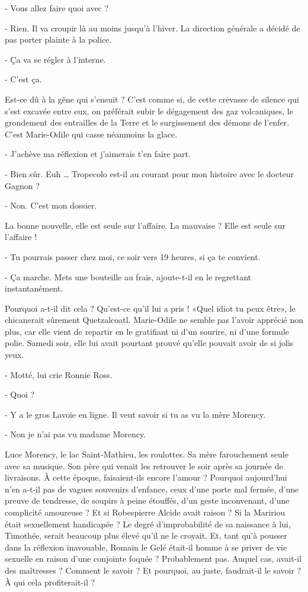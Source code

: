 - Vous allez faire quoi avec ?

- Rien. Il va croupir là au moins jusqu’à l’hiver. La direction générale a décidé de pas porter plainte à la police.

- Ça va se régler à l’interne.

- C’est ça.

Est-ce dû à la gêne qui s’ensuit ? C’est comme si, de cette crevasse de silence qui s’est excavée entre eux, on préférait subir le dégagement des gaz volcaniques, le grondement des entrailles de la Terre et le surgissement des démons de l’enfer. C’est Marie-Odile qui casse néanmoins la glace.

- J’achève ma réflexion et j’aimerais t’en faire part.

- Bien sûr. Euh … Tropecolo est-il au courant pour mon histoire avec le docteur Gagnon ?

- Non. C’est mon dossier.

La bonne nouvelle, elle est seule sur l’affaire. La mauvaise ? Elle est seule sur l’affaire !

- Tu pourrais passer chez moi, ce soir vers 19 heures, si ça te convient.

- Ça marche. Mets une bouteille au frais, ajoute-t-il en le regrettant instantanément.

Pourquoi a-t-il dit cela ? Qu’est-ce qu’il lui a pris ! «Quel idiot tu peux être», le chicanerait sûrement Quetzalcoatl. Marie-Odile ne semble pas l’avoir apprécié non plus, car elle vient de repartir en le gratifiant ni d’un sourire, ni d’une formule polie. Samedi soir, elle lui avait pourtant prouvé qu’elle pouvait avoir de si jolis yeux.

- Motté, lui crie Ronnie Ross.

- Quoi ?

- Y a le gros Lavoie en ligne. Il veut savoir si tu as vu la mère Morency.

- Non je n’ai pas vu madame Morency.

Luce Morency, le lac Saint-Mathieu, les roulottes. Sa mère farouchement seule avec sa musique. Son père qui venait les retrouver le soir après sa journée de livraisons. À cette époque, faisaient-ils encore l’amour ? Pourquoi aujourd’hui n’en a-t-il pas de vagues souvenirs d’enfance, ceux d’une porte mal fermée, d’une preuve de tendresse, de soupirs à peine étouffés, d’un geste inconvenant, d’une complicité amoureuse ? Et si Robespierre Alcide avait raison ? Si la Maririou était sexuellement handicapée ? Le degré d’improbabilité de sa naissance à lui, Timothée, serait beaucoup plus élevé qu’il ne le croyait. Et, tant qu’à pousser dans la réflexion inavouable, Romain le Gelé était-il homme à se priver de vie sexuelle en raison d’une conjointe foquée ? Probablement pas. Auquel cas, avait-il des maîtresses ? Comment le savoir ? Et pourquoi, au juste, faudrait-il le savoir ? À qui cela profiterait-il ?

